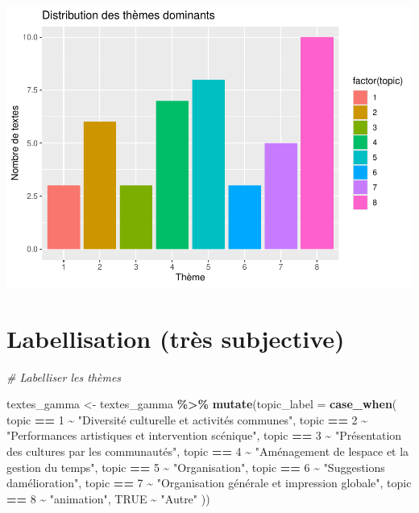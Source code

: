 \documentclass[
]{article}
\newenvironment{Shaded}{\begin{snugshade}}{\end{snugshade}}
\newcommand{\AttributeTok}[1]{\textcolor[rgb]{0.13,0.29,0.53}{#1}}
\newcommand{\CommentTok}[1]{\textcolor[rgb]{0.56,0.35,0.01}{\textit{#1}}}
\newcommand{\ConstantTok}[1]{\textcolor[rgb]{0.56,0.35,0.01}{#1}}
\newcommand{\DecValTok}[1]{\textcolor[rgb]{0.00,0.00,0.81}{#1}}
\newcommand{\FunctionTok}[1]{\textcolor[rgb]{0.13,0.29,0.53}{\textbf{#1}}}
\newcommand{\NormalTok}[1]{#1}
\newcommand{\OtherTok}[1]{\textcolor[rgb]{0.56,0.35,0.01}{#1}}
\newcommand{\SpecialCharTok}[1]{\textcolor[rgb]{0.81,0.36,0.00}{\textbf{#1}}}
\newcommand{\StringTok}[1]{\textcolor[rgb]{0.31,0.60,0.02}{#1}}
\begin{document}
\includegraphics{Texte_mining_files/figure-latex/unnamed-chunk-37-1.pdf}

\section{Labellisation (très
subjective)}\label{labellisation-truxe8s-subjective}

\begin{Shaded}
\begin{Highlighting}[]
\CommentTok{\# Labelliser les thèmes}

\NormalTok{textes\_gamma }\OtherTok{\textless{}{-}}\NormalTok{ textes\_gamma }\SpecialCharTok{\%\textgreater{}\%}
  \FunctionTok{mutate}\NormalTok{(}\AttributeTok{topic\_label =} \FunctionTok{case\_when}\NormalTok{(}
\NormalTok{    topic }\SpecialCharTok{==} \DecValTok{1} \SpecialCharTok{\textasciitilde{}} \StringTok{"Diversité culturelle et activités communes"}\NormalTok{,}
\NormalTok{    topic }\SpecialCharTok{==} \DecValTok{2} \SpecialCharTok{\textasciitilde{}} \StringTok{"Performances artistiques et intervention scénique"}\NormalTok{,}
\NormalTok{    topic }\SpecialCharTok{==} \DecValTok{3} \SpecialCharTok{\textasciitilde{}} \StringTok{"Présentation des cultures par les communautés"}\NormalTok{,}
\NormalTok{    topic }\SpecialCharTok{==} \DecValTok{4} \SpecialCharTok{\textasciitilde{}} \StringTok{"Aménagement de l\textquotesingle{}espace et la gestion du temps"}\NormalTok{,}
\NormalTok{    topic }\SpecialCharTok{==} \DecValTok{5} \SpecialCharTok{\textasciitilde{}} \StringTok{"Organisation"}\NormalTok{,}
\NormalTok{    topic }\SpecialCharTok{==} \DecValTok{6} \SpecialCharTok{\textasciitilde{}} \StringTok{"Suggestions d\textquotesingle{}amélioration"}\NormalTok{,}
\NormalTok{    topic }\SpecialCharTok{==} \DecValTok{7} \SpecialCharTok{\textasciitilde{}} \StringTok{"Organisation générale et impression globale"}\NormalTok{,}
\NormalTok{    topic }\SpecialCharTok{==} \DecValTok{8} \SpecialCharTok{\textasciitilde{}} \StringTok{"animation"}\NormalTok{,}
    \ConstantTok{TRUE} \SpecialCharTok{\textasciitilde{}} \StringTok{"Autre"}
\NormalTok{  ))}
\end{Highlighting}
\end{Shaded}
\end{document}
